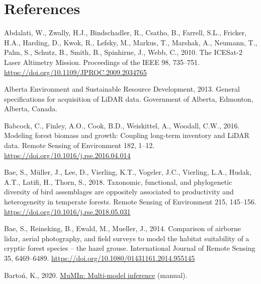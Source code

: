\documentclass[
]{article}
\newlength{\cslhangindent}
\newlength{\cslentryspacingunit} %
\newenvironment{CSLReferences}[2] %
 {%
  \setlength{\parindent}{0pt}
  \ifodd #1
  \let\oldpar\par
  \def\par{\hangindent=\cslhangindent\oldpar}
  \fi
  \setlength{\parskip}{#2\cslentryspacingunit}
 }%
 {}
\begin{document}
\pagebreak

\pagebreak

\hypertarget{references}{%
\section*{References}\label{references}}

\hypertarget{refs}{}
\begin{CSLReferences}{1}{0}
\leavevmode{}%
Abdalati, W., Zwally, H.J., Bindschadler, R., Csatho, B., Farrell, S.L., Fricker, H.A., Harding, D., Kwok, R., Lefsky, M., Markus, T., Marshak, A., Neumann, T., Palm, S., Schutz, B., Smith, B., Spinhirne, J., Webb, C., 2010. The {ICESat}-2 {Laser} {Altimetry} {Mission}. Proceedings of the IEEE 98, 735--751. \url{https://doi.org/10.1109/JPROC.2009.2034765}

\leavevmode{}%
Alberta Environment and Sustainable Resource Development, 2013. General specifications for acquisition of {LiDAR} data. Government of Alberta, Edmonton, Alberta, Canada.

\leavevmode{}%
Babcock, C., Finley, A.O., Cook, B.D., Weiskittel, A., Woodall, C.W., 2016. Modeling forest biomass and growth: {Coupling} long-term inventory and {LiDAR} data. Remote Sensing of Environment 182, 1--12. \url{https://doi.org/10.1016/j.rse.2016.04.014}

\leavevmode{}%
Bae, S., Müller, J., Lee, D., Vierling, K.T., Vogeler, J.C., Vierling, L.A., Hudak, A.T., Latifi, H., Thorn, S., 2018. Taxonomic, functional, and phylogenetic diversity of bird assemblages are oppositely associated to productivity and heterogeneity in temperate forests. Remote Sensing of Environment 215, 145--156. \url{https://doi.org/10.1016/j.rse.2018.05.031}

\leavevmode{}%
Bae, S., Reineking, B., Ewald, M., Mueller, J., 2014. Comparison of airborne lidar, aerial photography, and field surveys to model the habitat suitability of a cryptic forest species -- the hazel grouse. International Journal of Remote Sensing 35, 6469--6489. \url{https://doi.org/10.1080/01431161.2014.955145}

\leavevmode{}%
Bartoń, K., 2020. \href{https://CRAN.R-project.org/package=MuMIn}{{MuMIn}: {Multi}-model inference} (manual).


\end{CSLReferences}
\end{document}

